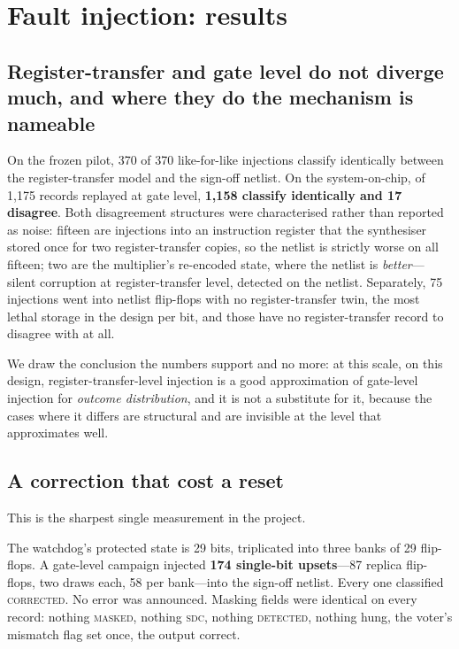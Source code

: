 \documentclass[11pt,a4paper]{article}
\begin{document}
\section{Fault injection: results}
\label{sec:fi-results}

\subsection{Register-transfer and gate level do not diverge much, and
where they do the mechanism is nameable}

On the frozen pilot, 370 of 370 like-for-like injections classify
identically between the register-transfer model and the sign-off netlist.
On the system-on-chip, of 1{,}175 records replayed at gate level,
\textbf{1{,}158 classify identically and 17 disagree}. Both disagreement
structures were characterised rather than reported as noise: fifteen are
injections into an instruction register that the synthesiser stored once
for two register-transfer copies, so the netlist is strictly worse on all
fifteen; two are the multiplier's re-encoded state, where the netlist is
\emph{better}---silent corruption at register-transfer level, detected on
the netlist. Separately, 75 injections went into netlist flip-flops with
no register-transfer twin, the most lethal storage in the design per bit,
and those have no register-transfer record to disagree with at all.

We draw the conclusion the numbers support and no more: at this scale,
on this design, register-transfer-level injection is a good
approximation of gate-level injection for \emph{outcome distribution},
and it is not a substitute for it, because the cases where it differs are
structural and are invisible at the level that approximates well.

\subsection{A correction that cost a reset}
\label{sec:w9}

This is the sharpest single measurement in the project.

The watchdog's protected state is 29 bits, triplicated into three banks
of 29 flip-flops. A gate-level campaign injected \textbf{174 single-bit
upsets}---87 replica flip-flops, two draws each, 58 per bank---into the
sign-off netlist. Every one classified \textsc{corrected}. No error was
announced. Masking fields were identical on every record: nothing
\textsc{masked}, nothing \textsc{sdc}, nothing \textsc{detected}, nothing
hung, the voter's mismatch flag set once, the output correct.
\end{document}

